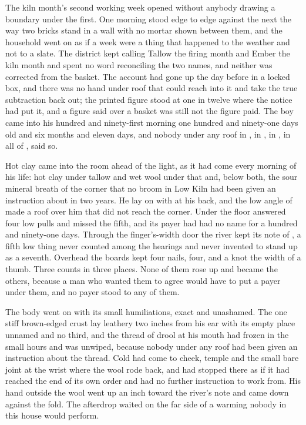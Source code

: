 
The kiln month's second working week opened without anybody drawing a boundary under the first. One morning stood edge to edge against the next the way two bricks stand in a wall with no mortar shown between them, and the household went on as if a week were a thing that happened to the weather and not to a slate. The district kept calling Tallow the firing month and Ember the kiln month and spent no word reconciling the two names, and neither was corrected from the basket. The account had gone up  the day before in a locked box, and there was no hand under  roof that could reach into it and take the true subtraction back out; the printed figure stood at one in twelve where the notice had put it, and a figure said over a basket was still not the figure paid. The boy came into his hundred and ninety-first morning one hundred and ninety-one days old and six months and eleven days, and nobody under any roof in , in , in , in all of , said so.

Hot clay came into the room ahead of the light, as it had come every morning of his life: hot clay under tallow and wet wool under that and, below both, the sour mineral breath of the corner that no broom in Low Kiln had been given an instruction about in two years. He lay on  with  at his back, and the low angle of  made a roof over him that did not reach the corner. Under the floor  answered four low pulls and missed the fifth, and its payer had had no name for a hundred and ninety-one days. Through the finger's-width door the river kept its note of , a fifth low thing never counted among the hearings and never invented to stand up as a seventh. Overhead the boards kept four nails, four, and a knot the width of a thumb. Three counts in three places. None of them rose up and became the others, because a man who wanted them to agree would have to put a payer under them, and no payer stood to any of them.

The body went on with its small humiliations, exact and unashamed. The one stiff brown-edged crust lay leathery two inches from his ear with its empty place unnamed and no third, and the thread of drool at his mouth had frozen in the small hours and was unwiped, because nobody under any roof had been given an instruction about the thread. Cold had come to cheek, temple and the small bare joint at the wrist where the wool rode back, and had stopped there as if it had reached the end of its own order and had no further instruction to work from. His hand outside the wool went up an inch toward the river's note and came down against the fold. The afterdrop waited on the far side of a warming nobody in this house would perform.

